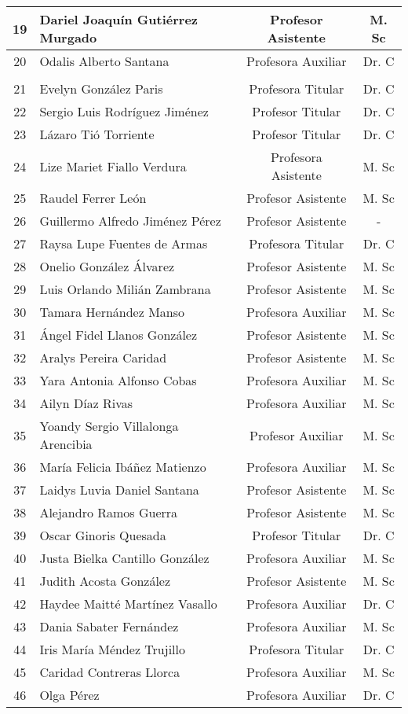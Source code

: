 \begin{longtable}{|c|p{7cm}|c|c|}
\\ \hline
	19 & Dariel Joaquín Gutiérrez Murgado & Profesor Asistente & M. Sc
\\ \hline
	20 & Odalis Alberto Santana & Profesora Auxiliar & Dr. C
\\ \hline
	\mc{4}{|>{}r|}{Continúa en la siguiente página }\\  
	\hline
	21 & Evelyn González Paris & Profesora Titular & Dr. C
\\ \hline
	22 & Sergio Luis Rodríguez Jiménez & Profesor Titular & Dr. C
\\ \hline
	23 & Lázaro Tió Torriente & Profesor Titular & Dr. C
\\ \hline
	24 & Lize Mariet Fiallo Verdura & Profesora Asistente & M. Sc
\\ \hline
	25 & Raudel Ferrer León & Profesor Asistente & M. Sc
\\ \hline
	26 & Guillermo Alfredo Jiménez Pérez & Profesor Asistente & -
\\ \hline
	27 & Raysa Lupe Fuentes de Armas & Profesora Titular & Dr. C
\\ \hline
	28 & Onelio González Álvarez & Profesor Asistente & M. Sc
\\ \hline
	29 & Luis Orlando Milián Zambrana & Profesor Asistente & M. Sc
\\ \hline
	30 & Tamara Hernández Manso & Profesora Auxiliar & M. Sc
\\ \hline
	31 & Ángel Fidel Llanos González & Profesor Asistente & M. Sc
\\ \hline
	32 & Aralys Pereira Caridad & Profesor Asistente & M. Sc
\\ \hline
	33 & Yara Antonia Alfonso Cobas & Profesora Auxiliar & M. Sc
\\ \hline
	34 & Ailyn Díaz Rivas & Profesora Auxiliar & M. Sc
\\ \hline
	35 & Yoandy Sergio Villalonga Arencibia & Profesor Auxiliar & M. Sc
\\ \hline
	36 & María Felicia Ibáñez Matienzo & Profesora Auxiliar & M. Sc
\\ \hline
	37 & Laidys Luvia Daniel Santana & Profesor Asistente & M. Sc
\\ \hline
	38 & Alejandro Ramos Guerra & Profesor Asistente & M. Sc
\\ \hline
	39 & Oscar Ginoris Quesada & Profesor Titular & Dr. C
\\ \hline
	40 & Justa Bielka Cantillo González & Profesora Auxiliar & M. Sc
\\ \hline
	41 & Judith Acosta González & Profesor Asistente & M. Sc
\\ \hline
	42 & Haydee Maitté Martínez Vasallo & Profesora Auxiliar & Dr. C
\\ \hline
	43 & Dania Sabater Fernández & Profesora Auxiliar & M. Sc
\\ \hline
	44 & Iris María Méndez Trujillo & Profesora Titular & Dr. C
\\ \hline
	45 & Caridad Contreras Llorca & Profesora Auxiliar & M. Sc
\\ \hline
	46 & Olga Pérez & Profesora Auxiliar & Dr. C \\ \hline
	\hline
\end{longtable}